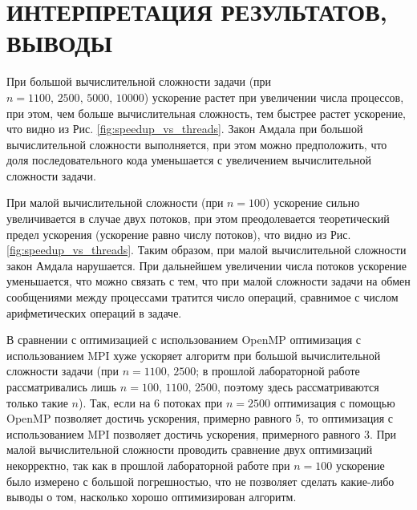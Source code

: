 \section{ИНТЕРПРЕТАЦИЯ РЕЗУЛЬТАТОВ, ВЫВОДЫ}

При большой вычислительной сложности задачи (при $n=1100,\, 2500,\, 5000,\, 10000$) ускорение растет при увеличении числа процессов, при этом, чем больше вычислительная сложность, тем быстрее растет ускорение, что видно из Рис. \ref{fig:speedup_vs_threads}. Закон Амдала при большой вычислительной сложности выполняется, при этом можно предположить, что доля последовательного кода уменьшается с увеличением вычислительной сложности задачи.

При малой вычислительной сложности (при $n=100$) ускорение сильно увеличивается в случае двух потоков, при этом преодолевается теоретический предел ускорения (ускорение равно числу потоков), что видно из Рис. \ref{fig:speedup_vs_threads}. Таким образом, при малой вычислительной сложности закон Амдала нарушается. При дальнейшем увеличении числа потоков ускорение уменьшается, что можно связать с тем, что при малой сложности задачи на обмен сообщениями между процессами тратится число операций, сравнимое с числом арифметических операций в задаче.

В сравнении с оптимизацией с использованием OpenMP оптимизация с использованием MPI хуже ускоряет алгоритм при большой вычислительной сложности задачи (при $n=1100,\, 2500$; в прошлой лабораторной работе рассматривались лишь $n=100,\, 1100,\, 2500$, поэтому здесь рассматриваются только такие $n$). Так, если на 6 потоках при $n=2500$ оптимизация с помощью OpenMP позволяет достичь ускорения, примерно равного 5, то оптимизация с использованием MPI позволяет достичь ускорения, примерного равного 3. При малой вычислительной сложности проводить сравнение двух оптимизаций некорректно, так как в прошлой лабораторной работе при $n=100$ ускорение было измерено с большой погрешностью, что не позволяет сделать какие-либо выводы о том, насколько хорошо оптимизирован алгоритм.